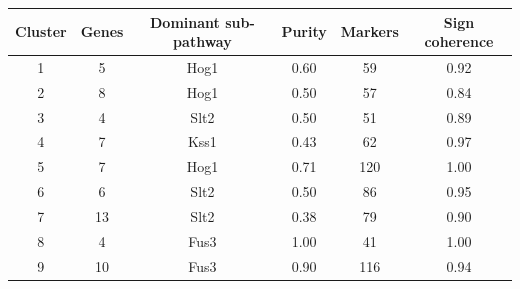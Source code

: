 \begin{tabular}{cccccc}
\toprule
Cluster & Genes & Dominant sub-pathway & Purity & Markers & Sign coherence \\
\midrule
1 & 5 & Hog1 & 0.60 & 59 & 0.92 \\
2 & 8 & Hog1 & 0.50 & 57 & 0.84 \\
3 & 4 & Slt2 & 0.50 & 51 & 0.89 \\
4 & 7 & Kss1 & 0.43 & 62 & 0.97 \\
5 & 7 & Hog1 & 0.71 & 120 & 1.00 \\
6 & 6 & Slt2 & 0.50 & 86 & 0.95 \\
7 & 13 & Slt2 & 0.38 & 79 & 0.90 \\
8 & 4 & Fus3 & 1.00 & 41 & 1.00 \\
9 & 10 & Fus3 & 0.90 & 116 & 0.94 \\
\bottomrule
\end{tabular}